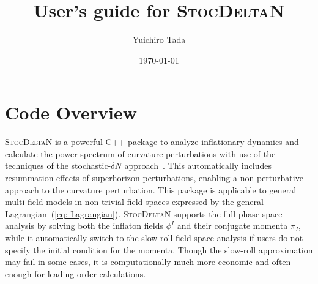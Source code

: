 \documentclass[aps, prd
, preprint
, nofootinbib 
, notitlepage
, superscriptaddress
, longbibliography
]{revtex4-1}
\newcommand{\Blue}[1]{\textcolor{blue}{\sffamily #1}}
\begin{document}
\title{User's guide for \textsc{StocDeltaN}}%
\date{\today}

\author{Yuichiro Tada}



\maketitle

\section{Code Overview}

\textsc{StocDeltaN} is a powerful C++ package to analyze inflationary dynamics and calculate the power spectrum of curvature perturbations with use of the techniques of 
the stochastic-$\delta N$ approach~\cite{Fujita:2013cna,Vennin:2015hra}. 
This automatically includes resummation effects of superhorizon perturbations, enabling a non-perturbative approach to the curvature perturbation.
This package is applicable to general multi-field models in non-trivial field spaces expressed by the general Lagrangian~(\ref{eq: Lagrangian}).
\textsc{StocDeltaN} supports the full phase-space analysis by solving both the inflaton fields $\phi^I$ and their conjugate momenta $\pi_I$, while it automatically switch to the slow-roll field-space analysis if users do not specify the initial condition for the momenta.
Though the slow-roll approximation may fail in some cases, it is computationally much more economic and often enough for leading order calculations.

\end{document}
